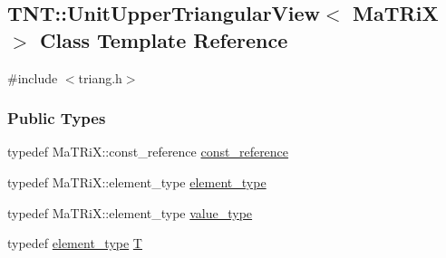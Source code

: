 \subsection{TNT::UnitUpperTriangularView$<$ MaTRiX $>$ Class Template Reference}
\label{class_t_n_t_1_1_unit_upper_triangular_view}


{\ttfamily \#include $<$triang.h$>$}

\subsubsection*{Public Types}
\begin{DoxyCompactItemize}
\item 
typedef MaTRiX::const\_\-reference \hyperlink{class_t_n_t_1_1_unit_upper_triangular_view_ac1baa9e5d305995a7ce8a10ee57e0fd6}{const\_\-reference}
\item 
typedef MaTRiX::element\_\-type \hyperlink{class_t_n_t_1_1_unit_upper_triangular_view_ade49853ca5425d55f180697c89ae914b}{element\_\-type}
\item 
typedef MaTRiX::element\_\-type \hyperlink{class_t_n_t_1_1_unit_upper_triangular_view_a81d487729e37d57db10b1527057e526e}{value\_\-type}
\item 
typedef \hyperlink{class_t_n_t_1_1_unit_upper_triangular_view_ade49853ca5425d55f180697c89ae914b}{element\_\-type} \hyperlink{class_t_n_t_1_1_unit_upper_triangular_view_a794aadc02accb0b9525c25e3d698e2c8}{T}
\end{DoxyCompactItemize}
